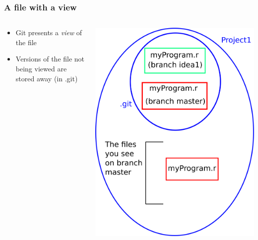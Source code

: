 \documentclass{beamer}
\begin{document}
\begin{frame}
  \frametitle{A file with a view}
  \begin{columns}[T]
    \begin{column}{.5\textwidth}
      \begin{itemize}
      \item Git presents a \emph{view} of the file
      \item Versions of the file not being viewed are stored away (in
        \alert{.git})
      \end{itemize}
    \end{column}
    \begin{column}{.5\textwidth}
      \includegraphics[width=\textwidth]{with_git1.png}
    \end{column}
  \end{columns}
\end{frame}
\end{document}
